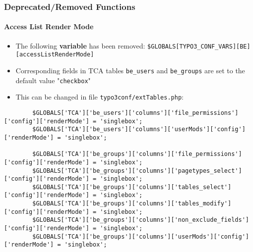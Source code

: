 \begin{frame}[fragile]
	\frametitle{Deprecated/Removed Functions}
	\framesubtitle{Access List Render Mode}

	\lstset{basicstyle=\tiny\ttfamily}

	\begin{itemize}

		\item The following \textbf{variable} has been removed:
			\small\texttt{\$GLOBALS[TYPO3\_CONF\_VARS][BE][accessListRenderMode]}\normalsize

		\item Corresponding fields in TCA tables \texttt{be\_users} and \texttt{be\_groups}
			are set to the default value "\texttt{checkbox}"

		\item This can be changed in file \texttt{typo3conf/extTables.php}:

	\end{itemize}

	\begin{lstlisting}
		$GLOBALS['TCA']['be_users']['columns']['file_permissions']['config']['renderMode'] = 'singlebox';
		$GLOBALS['TCA']['be_users']['columns']['userMods']['config']['renderMode'] = 'singlebox';

		$GLOBALS['TCA']['be_groups']['columns']['file_permissions']['config']['renderMode'] = 'singlebox';
		$GLOBALS['TCA']['be_groups']['columns']['pagetypes_select']['config']['renderMode'] = 'singlebox';
		$GLOBALS['TCA']['be_groups']['columns']['tables_select']['config']['renderMode'] = 'singlebox';
		$GLOBALS['TCA']['be_groups']['columns']['tables_modify']['config']['renderMode'] = 'singlebox';
		$GLOBALS['TCA']['be_groups']['columns']['non_exclude_fields']['config']['renderMode'] = 'singlebox';
		$GLOBALS['TCA']['be_groups']['columns']['userMods']['config']['renderMode'] = 'singlebox';
	\end{lstlisting}

\end{frame}


